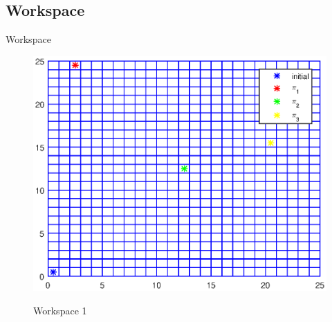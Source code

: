 \documentclass{beamer}
\begin{document}
\subsection{Workspace}
\begin{frame}{Workspace}
\begin{figure}[!htb]
\centering
\includegraphics[scale=0.7]{../writing/workspace.eps}
\label{fig:workspace}
\caption{Workspace 1}
\end{figure}
\end{frame}
\end{document}
